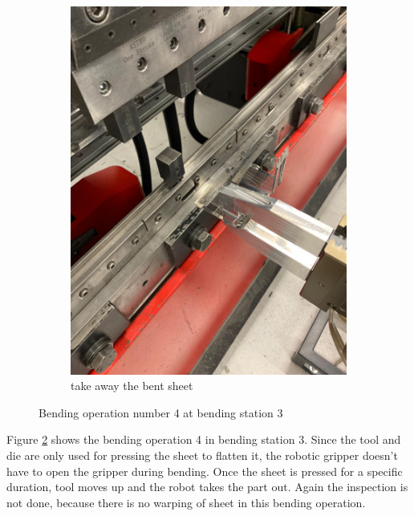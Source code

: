 \begin{figure}[h]
\begin{subfigure}[b]{0.32\textwidth}
        \includegraphics[width=\textwidth]{figures/bending/bending4-003.png}
        \caption{take away the bent sheet}
        \label{subfig:bending4-after}
    \end{subfigure}\hspace{0.1cm}
    \caption{Bending operation number 4 at bending station 3}
    \label{fig:bending-operation-4}
\end{figure}


Figure \ref{fig:bending-operation-4} shows the bending operation 4 in bending station 3. Since the tool and die are only used for pressing the sheet to flatten it, the robotic gripper doesn't have to open the gripper during bending. Once the sheet is pressed for a specific duration, tool moves up and the robot takes the part out.  Again the inspection is not done, because there is no warping of sheet in this bending operation.


